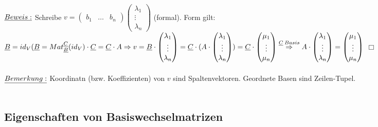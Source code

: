 \documentclass[fleqn, a4paper, 11pt]{scrartcl}
\theoremstyle{definition}
\begin{document}
\\
$\uline{Beweis:}$ Schreibe $v=\begin{pmatrix}
	b_1 & \dots & b_n
\end{pmatrix}\begin{pmatrix}
	\lambda_1\\
	\vdots\\
	\lambda_n
\end{pmatrix}$ (formal). Form gilt: $\uline{B}=id_V(\uline{B}=Mat_{\uline{B}}^{\uline{C}}(id_V)\cdot\uline{C}=\uline{C}\cdot A\Rightarrow v=\uline{B}\cdot\begin{pmatrix}
	\lambda_1\\
	\vdots\\
	\lambda_n
\end{pmatrix}=\uline{C}\cdot(A\cdot\begin{pmatrix}
	\lambda_1\\
	\vdots\\
	\lambda_n
\end{pmatrix})=\uline{C}\cdot\begin{pmatrix}
	\mu_1\\
	\vdots\\
	\mu_n
\end{pmatrix}\stackrel{\uline{C}\:Basis}{\Rightarrow} A\cdot\begin{pmatrix}
	\lambda_1\\
	\vdots\\
	\lambda_n
\end{pmatrix}=\begin{pmatrix}
	\mu_1\\
	\vdots\\
	\mu_n
\end{pmatrix}$ \hfill $\Box$\\
\\
$\uline{Bemerkung:}$ Koordinatn (bzw. Koeffizienten) von $v$ sind Spaltenvektoren. Geordnete Basen sind \dq Zeilen-Tupel\dq.\\
\\
\subsection{Eigenschaften von Basiswechselmatrizen}
\end{document}
